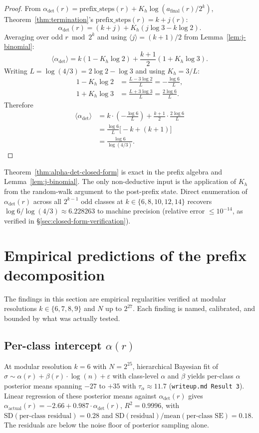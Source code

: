 \documentclass[pdflatex,sn-mathphys-num]{sn-jnl}
\theoremstyle{thmstyleone}%
\theoremstyle{definition}
\theoremstyle{plain}
\begin{document}
\begin{proof}
    From $\alpha_{\text{det}}(r) = \text{prefix\_steps}(r) + K_h \log(a_{\text{final}}(r)/2^k)$, Theorem~\ref{thm:termination}'s $\text{prefix\_steps}(r) = k + j(r)$:
    $$\alpha_{\text{det}}(r) = (k + j) + K_h (j \log 3 - k \log 2).$$
    Averaging over odd $r \bmod 2^k$ and using $\langle j \rangle = (k+1)/2$ from Lemma~\ref{lem:j-binomial}:
    $$\langle \alpha_{\text{det}} \rangle = k(1 - K_h \log 2) + \frac{k+1}{2}(1 + K_h \log 3).$$
    Writing $L = \log(4/3) = 2 \log 2 - \log 3$ and using $K_h = 3/L$:
    \begin{align*}
    1 - K_h \log 2 &= \frac{L - 3 \log 2}{L} = -\frac{\log 6}{L}, \\
    1 + K_h \log 3 &= \frac{L + 3 \log 3}{L} = \frac{2 \log 6}{L}.
    \end{align*}
    Therefore
    \begin{align*}
    \langle \alpha_{\text{det}} \rangle
      &= k \cdot \left(-\frac{\log 6}{L}\right) + \frac{k+1}{2} \cdot \frac{2 \log 6}{L} \\
      &= \frac{\log 6}{L}\bigl[-k + (k+1)\bigr] \\
      &= \frac{\log 6}{\log(4/3)}.
    \end{align*}
\end{proof}

Theorem~\ref{thm:alpha-det-closed-form} is exact in the prefix algebra and Lemma~\ref{lem:j-binomial}. The only non-deductive input is the application of $K_h$ from the random-walk argument to the post-prefix state. Direct enumeration of $\alpha_{\text{det}}(r)$ across all $2^{k-1}$ odd classes at $k \in \{6, 8, 10, 12, 14\}$ recovers $\log 6 / \log(4/3) \approx 6.228263$ to machine precision (relative error $\leq 10^{-14}$, as verified in \S\ref{sec:closed-form-verification}).

\section{Empirical predictions of the prefix decomposition}
\label{sec:empirics}
The findings in this section are empirical regularities verified at modular resolutions $k \in \{6, 7, 8, 9\}$ and $N$ up to $2^{27}$. Each finding is named, calibrated, and bounded by what was actually tested.

\subsection{Per-class intercept $\alpha(r)$}
At modular resolution $k = 6$ with $N=2^{25}$, hierarchical Bayesian fit of $\sigma \sim \alpha(r) + \beta(r) \cdot \log(n) + \varepsilon$ with class-level $\alpha$ and $\beta$ yields per-class $\alpha$ posterior means spanning $-27$ to $+35$ with $\tau_\alpha \approx 11.7$ (\texttt{writeup.md Result 3}). Linear regression of these posterior means against $\alpha_{\text{det}}(r)$ gives $\alpha_{\text{actual}}(r) = -2.66 + 0.987 \cdot \alpha_{\text{det}}(r)$, $R^2 = 0.9996$, with $\mathrm{SD}(\text{per-class residual}) = 0.28$ and $\mathrm{SD}(\text{residual})/\mathrm{mean}(\text{per-class SE}) = 0.18$. The residuals are below the noise floor of posterior sampling alone.
\end{document}
